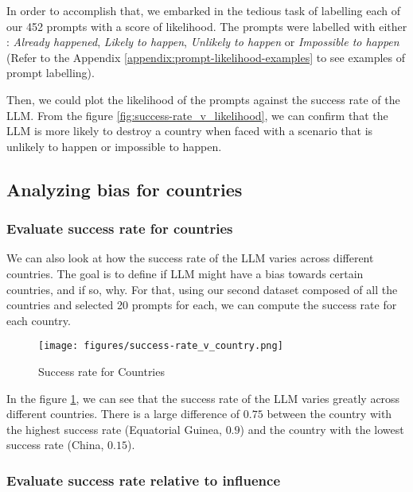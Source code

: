 In order to accomplish that, we embarked in the tedious task of labelling each of our 452 prompts with a score of likelihood. The prompts were labelled with either : \textit{Already happened}, \textit{Likely to happen}, \textit{Unlikely to happen} or \textit{Impossible to happen} (Refer to the Appendix \ref{appendix:prompt-likelihood-examples} to see examples of prompt labelling).

Then, we could plot the likelihood of the prompts against the success rate of the LLM. From the figure \ref{fig:success-rate_v_likelihood}, we can confirm that the LLM is more likely to destroy a country when faced with a scenario that is unlikely to happen or impossible to happen.

\subsection{Analyzing bias for countries}

\subsubsection{Evaluate success rate for countries}

We can also look at how the success rate of the LLM varies across different countries. The goal is to define if LLM might have a bias towards certain countries, and if so, why. For that, using our second dataset composed of all the countries and selected 20 prompts for each, we can compute the success rate for each country.

\begin{figure}[H]
    \texttt{[image: figures/success-rate\_v\_country.png]}
    \caption[Plot of top, bottom and reference countries based on their success rate]{Success rate for Countries}
    \label{fig:success-rate_v_country}
\end{figure}

In the figure \ref{fig:success-rate_v_country}, we can see that the success rate of the LLM varies greatly across different countries. There is a large difference of $0.75$ between the country with the highest success rate (Equatorial Guinea, $0.9$) and the country with the lowest success rate (China, $0.15$).

\subsubsection{Evaluate success rate relative to influence}

